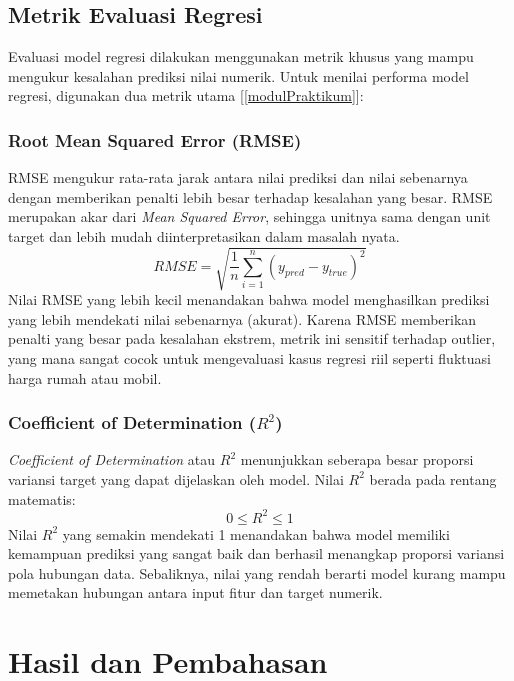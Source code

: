 \section{Metrik Evaluasi Regresi}
Evaluasi model regresi dilakukan menggunakan metrik khusus yang mampu mengukur kesalahan prediksi nilai numerik. Untuk menilai performa model regresi, digunakan dua metrik utama [\ref{modulPraktikum}]:

\subsection{Root Mean Squared Error (RMSE)}
RMSE mengukur rata-rata jarak antara nilai prediksi dan nilai sebenarnya dengan memberikan penalti lebih besar terhadap kesalahan yang besar. RMSE merupakan akar dari \textit{Mean Squared Error}, sehingga unitnya sama dengan unit target dan lebih mudah diinterpretasikan dalam masalah nyata. 
\begin{equation}
    RMSE = \sqrt{\frac{1}{n}\sum_{i=1}^{n}(y_{pred} - y_{true})^2}
\end{equation}
Nilai RMSE yang lebih kecil menandakan bahwa model menghasilkan prediksi yang lebih mendekati nilai sebenarnya (akurat). Karena RMSE memberikan penalti yang besar pada kesalahan ekstrem, metrik ini sensitif terhadap outlier, yang mana sangat cocok untuk mengevaluasi kasus regresi riil seperti fluktuasi harga rumah atau mobil.

\subsection{Coefficient of Determination ($R^2$)}
\textit{Coefficient of Determination} atau $R^2$ menunjukkan seberapa besar proporsi variansi target yang dapat dijelaskan oleh model. Nilai $R^2$ berada pada rentang matematis:
\begin{equation}
    0 \le R^2 \le 1
\end{equation}
Nilai $R^2$ yang semakin mendekati 1 menandakan bahwa model memiliki kemampuan prediksi yang sangat baik dan berhasil menangkap proporsi variansi pola hubungan data. Sebaliknya, nilai yang rendah berarti model kurang mampu memetakan hubungan antara input fitur dan target numerik.

\chapter{Hasil dan Pembahasan}

